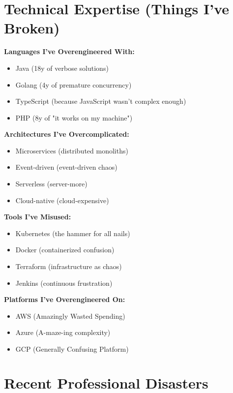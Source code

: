 \documentclass[10pt,a4paper]{article}
\begin{document}
\section{Technical Expertise (Things I've Broken)}

\begin{multicols}{2}
\textbf{Languages I've Overengineered With:}
\begin{itemize}[leftmargin=*,itemsep=1pt]
    \item Java (18y of verbose solutions)
    \item Golang (4y of premature concurrency)
    \item TypeScript (because JavaScript wasn't complex enough)
    \item PHP (8y of "it works on my machine")
\end{itemize}

\textbf{Architectures I've Overcomplicated:}
\begin{itemize}[leftmargin=*,itemsep=1pt]
    \item Microservices (distributed monoliths)
    \item Event-driven (event-driven chaos)
    \item Serverless (server-more)
    \item Cloud-native (cloud-expensive)
\end{itemize}

\textbf{Tools I've Misused:}
\begin{itemize}[leftmargin=*,itemsep=1pt]
    \item Kubernetes (the hammer for all nails)
    \item Docker (containerized confusion)
    \item Terraform (infrastructure as chaos)
    \item Jenkins (continuous frustration)
\end{itemize}

\textbf{Platforms I've Overengineered On:}
\begin{itemize}[leftmargin=*,itemsep=1pt]
    \item AWS (Amazingly Wasted Spending)
    \item Azure (A-maze-ing complexity)
    \item GCP (Generally Confusing Platform)
\end{itemize}
\end{multicols}

\section{Recent Professional Disasters}
\end{document}
